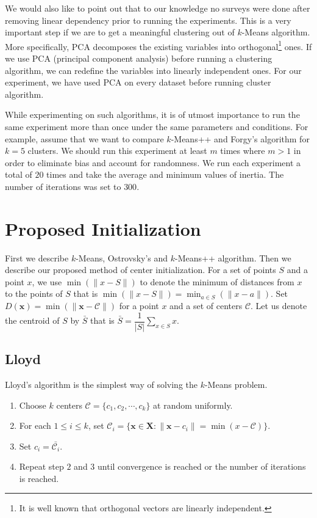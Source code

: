 \documentclass[twoside, 11pt]{article}
\newcommand{\x}{\mathbf{x}}
\newcommand{\X}{\mathbf{X}}
\newcommand{\C}{\mathcal{C}}
\begin{document}
	We would also like to point out that to our knowledge no surveys were done after removing linear dependency prior to running the experiments. This is a very important step if we are to get a meaningful clustering out of $k$-Means algorithm. More specifically, PCA decomposes the existing variables into orthogonal\footnote{It is well known that orthogonal vectors are linearly independent.} ones. If we use PCA (principal component analysis) before running a clustering algorithm, we can redefine the variables into linearly independent ones. For our experiment, we have used PCA on every dataset before running cluster algorithm.
	
	While experimenting on such algorithms, it is of utmost importance to run the same experiment more than once under the same parameters and conditions. For example, assume that we want to compare $k$-Means++ and Forgy's algorithm \cite{forgy} for $k=5$ clusters. We should run this experiment at least $m$ times where $m>1$ in order to eliminate bias and account for randomness. We run each experiment a total of $20$ times and take the average and minimum values of inertia. The number of iterations was set to $300$.
	\section{Proposed Initialization}
	First we describe $k$-Means, Ostrovsky's and $k$-Means++ algorithm. Then we describe our proposed method of center initialization. For a set of points $S$ and a point $x$, we use $\min(\|x-S\|)$ to denote the minimum of distances from $x$ to the points of $S$ that is $\min(\| x-S\|)=\min_{a\in S}(\| x-a\|)$. Set $D(\x)=\min(\|\x-\C\|)$ for a point $x$ and a set of centers $\C$. Let us denote the centroid of $S$ by $\bar{S}$ that is $\bar{S}=\dfrac{1}{|S|}\sum_{x\in S}x$.
	\subsection{Lloyd}
	Lloyd's algorithm is the simplest way of solving the $k$-Means problem.
		\begin{enumerate}[i]
			\item Choose $k$ centers $\C=\{c_1,c_2,\cdots,c_k\}$ at random uniformly.
			\item For each $1\leq i\leq k$, set $\C_i=\{\x\in\X:\|\x-c_i\|=\min(x-\C)\}$.
			\item Set $c_i=\bar{\C_i}$.
			\item Repeat step $2$ and $3$ until convergence is reached or the number of iterations is reached.
		\end{enumerate}
\end{document}
